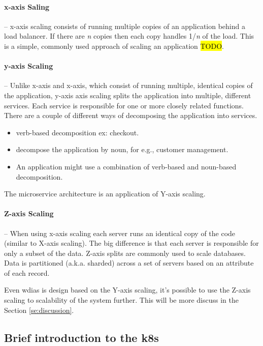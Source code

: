 \paragraph{x-axis Saling}-- x-axis scaling consists of running multiple copies of an application behind a load balancer. If there are \textit{n} copies then each copy handles 1/\textit{n} of the load. This is a simple, commonly used approach of scaling an application \hl{TODO}.

\paragraph{y-axis Scaling}-- Unlike x-axis and x-axis, which consist of running multiple, identical copies of the application, y-axis axis scaling splits the application into multiple, different services. Each service is responsible for one or more closely related functions. There are a couple of different ways of decomposing the application into services.
\begin{itemize}
    \item verb-based decomposition ex: checkout.
    \item decompose the application by noun, for e.g., customer management. 
    \item An application might use a combination of verb-based and noun-based decomposition.
\end{itemize}
    
The microservice architecture is an application of Y-axis scaling.

\paragraph{Z-axis Scaling}-- When using x-axis scaling each server runs an identical copy of the code (similar to X-axis scaling). The big difference is that each server is responsible for only a subset of the data. 
Z-axis splits are commonly used to scale databases. Data is partitioned (a.k.a. sharded) across a set of servers based on an attribute of each record.

Even \acrshort{wdias} is design based on the Y-axis scaling, it's possible to use the Z-axis scaling to scalability of the system further. This will be more discuss in the Section \ref{se:discussion}.

\subsection{Brief introduction to the \acrfull{k8s}}
\label{sebse:k8s_intro}


